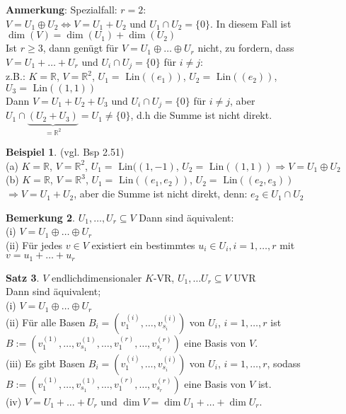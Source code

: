\documentclass[10pt,a4paper,numbers=endperiod]{scrartcl}
\theoremstyle{definition}
\newtheorem{satz}{Satz}[section]
\newtheorem{bem}[satz]{Bemerkung}
\newtheorem{bsp}[satz]{Beispiel}
\def\RR{{\mathbb R}}
\begin{document}
\textbf{Anmerkung}: Spezialfall: $r=2$:\\
$V=U_1 \oplus U_2 \Leftrightarrow V=U_1+U_2$ und $U_1 \cap U_2 = \{0\}$. In diesem Fall ist $\dim(V) = \dim (U_1) + \dim (U_2)$\\
Ist $r \geq 3$, dann genügt für $V= U_1 \oplus \ldots \oplus U_r$ nicht, zu fordern, dass $V=U_1+\ldots+U_r$ und $U_i \cap U_j = \{0\}$ für $i \neq j$:\\
z.B.: $K= \RR$, $V=\RR^2$, $U_1= \text{ Lin}((e_1))$, $U_2= \text{ Lin}((e_2))$, $U_3= \text{ Lin}((1,1))$\\
Dann $V=U_1+U_2+U_3$ und $U_i \cap U_j = \{0\}$ für $i \neq j$, aber $U_1 \cap \underbrace{(U_2+U_3)}_{=\RR^2} = U_1 \neq \{0\}$, d.h die Summe ist nicht direkt.

\begin{bsp}
	(vgl. Bsp 2.51)\\
	(a) $K=\RR$, $V=\RR^2$, $U_1= \text{ Lin}((1,-1)$, $U_2= \text{ Lin}((1,1)) \Rightarrow V=U_1 \oplus U_2$\\
	(b) $K=\RR$, $V=\RR^3$, $U_1 = \text{ Lin}((e_1,e_2))$, $U_2 = \text{ Lin}((e_2,e_3))$ $\Rightarrow V=U_1+U_2$, aber die Summe ist nicht direkt, denn: $e_2 \in U_1 \cap U_2$
\end{bsp}

\begin{bem}
	$U_1,\ldots,U_r \subseteq V$ Dann sind äquivalent:\\
	(i) $V= U_1 \oplus \ldots \oplus U_r$\\
	(ii) Für jedes $v \in V$ existiert ein bestimmtes $u_i \in U_i, i=1, \ldots,r$ mit $v=u_1+\ldots+u_r$
\end{bem}

\begin{satz}
	$V$ endlichdimensionaler $K$-VR, $U_1,\ldots U_r \subseteq V$ UVR\\
	Dann sind äquivalent;\\
	(i) $V= U_1 \oplus \ldots \oplus U_r$\\
	(ii) Für alle Basen $B_i= (v_1^{(i)},\ldots,v_{s_i}^{(i)})$ von $U_i$, $i=1,\ldots,r$ ist $B:= (v_1^{(1)},\ldots,v_{s_1}^{(1)},\ldots,v_1^{(r)},\ldots,v_{s_r}^{(r)})$ eine Basis von $V$.\\
	(iii) Es gibt Basen $B_i= (v_1^{(i)},\ldots,v_{s_i}^{(i)})$ von $U_i$, $i=1,\ldots,r$, sodass $B:= (v_1^{(1)},\ldots,v_{s_1}^{(1)},\ldots,v_1^{(r)},\ldots,v_{s_r}^{(r)})$ eine Basis von $V$ ist.\\
	(iv) $V=U_1+\ldots+U_r$ und $\dim V = \dim U_1+\ldots+\dim U_r$.
\end{satz}
\end{document}
